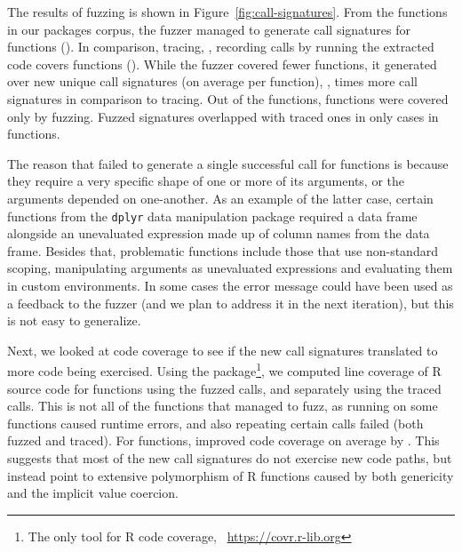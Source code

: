 \documentclass[sigplan,nonacm,anonymous,review]{acmart}
\begin{document}
The results of fuzzing is shown in Figure~\ref{fig:call-signatures}.
From the \UFNumFunctions functions in our \UFNumPackages packages corpus, the fuzzer managed to generate call signatures for \UFNumFunctionsSignatrSignature functions (\UFNumFunctionsSignatrToCorpusSignatureRatio).
In comparison, tracing, \Ie, recording calls by running the extracted code covers \UFNumFunctionsBaselineSignature functions (\UFNumFunctionsBaselineToCorpusSignatureRatio).
While the fuzzer covered fewer functions, it generated over \UFSignatrSignaturesRnd new unique call signatures (on average \UFAvgNewSignatrSignature per function), \Ie, \UFSignatrBaselineSignaturesRatio times more call signatures in comparison to tracing.
Out of the \UFNumFunctionsSignatrSignature functions, \UFNumFunctionsOnlySignatrSignature functions were covered only by fuzzing.
Fuzzed signatures overlapped with traced ones in only \UFSharedSignatures cases in \UFSharedSignatuesFunctions functions.

The reason that \tool failed to generate a single successful call for \UFNumMissingFunctionSignatr functions is because they require a very specific shape of one or more of its arguments, or the arguments depended on one-another.
As an example of the latter case, certain functions from the {\tt dplyr} data manipulation package required a data frame alongside an unevaluated expression made up of column names from the data frame. 
Besides that, problematic functions include those that use non-standard scoping, manipulating arguments as unevaluated expressions and evaluating them in custom environments.
In some cases the error message could have been used as a feedback to the fuzzer (and we plan to address it in the next iteration), but this is not easy to generalize.

Next, we looked at code coverage to see if the new call signatures translated to more code being exercised. 
Using the  package\footnote{The only tool for R code coverage, \Cf~\url{https://covr.r-lib.org}}, we computed line coverage of R source code for \UFNumFunctionsWithBothCoverage functions using the fuzzed calls, and separately using the traced calls.
This is not all of the functions that \tool managed to fuzz, as running  on some functions caused runtime errors, and also repeating certain calls failed (both fuzzed and traced).
For \UFBetterCoverage functions, \tool improved code coverage on average by \UFBetterCoverageMean.
This suggests that most of the new call signatures do not exercise new code paths, but instead point to extensive polymorphism of R functions caused by both genericity and the implicit value coercion. 
\end{document}
